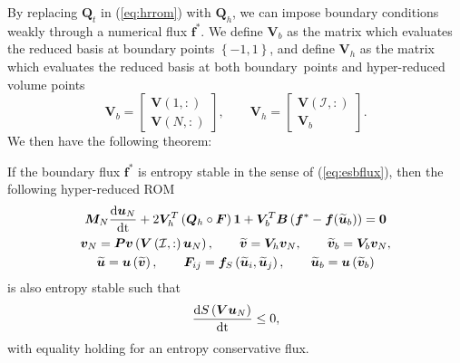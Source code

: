 \documentclass[review]{siamart171218}
\theoremstyle{assumption}
\renewcommand{\tilde}{\widetilde}
\newcommand{\td}[2]{\frac{{\rm d}#1}{{\rm d}{\rm #2}}}
\newcommand{\LRp}[1]{\left( #1 \right)}
\newcommand{\LRc}[1]{\left\{ #1 \right\}}
\begin{document}
By replacing $\bm{Q}_t$ in (\ref{eq:hrrom}) with $\bm{Q}_h$, we can impose boundary conditions weakly through a numerical flux $\bm{f}^*$.  We define $\bm{V}_b$ as the matrix which evaluates the reduced basis at boundary points $\LRc{-1,1}$, and define $\bm{V}_h$ as the matrix which evaluates the reduced basis at both boundary points and hyper-reduced volume points
\[
\bm{V}_{b} = \begin{bmatrix}\bm{V}(1,:) \\ \bm{V}(N,:)\end{bmatrix}, \qquad \bm{V}_h = \begin{bmatrix}
\bm{V}\LRp{\mathcal{I},:}\\
\bm{V}_{b}
\end{bmatrix}.
\]
We then have the following theorem:
\begin{theorem}
If the boundary flux $\bm{f}^*$ is entropy stable in the sense of (\ref{eq:esbflux}), then the following hyper-reduced ROM 
\begin{gather}
\bm{M}_N\td{\bm{u}_N}{t} + 2\bm{V}_h^T\LRp{\bm{Q}_h \circ \bm{F}}\bm{1} + \bm{V}_{b}^T\bm{B}\LRp{\bm{f}^* - \bm{f}(\tilde{\bm{u}}_b)} = \bm{0} \label{eq:esbchr}\\
\bm{v}_N = \bm{P}\bm{v}\LRp{\bm{V}\LRp{\mathcal{I},:}\bm{u}_N}, \qquad \tilde{\bm{v}} = 
\bm{V}_h
\bm{v}_N, \qquad \tilde{\bm{v}}_b = \bm{V}_b\bm{v}_N, \nonumber\\
\tilde{\bm{u}} = \bm{u}\LRp{\tilde{\bm{v}}}, \qquad \bm{F}_{ij} = \bm{f}_S\LRp{\tilde{\bm{u}}_i,\tilde{\bm{u}}_j}, \qquad  \tilde{\bm{u}}_b = \bm{u}\LRp{\tilde{\bm{v}}_b}\nonumber
\end{gather}
is also entropy stable such that
\[
\td{S\LRp{\bm{V}\bm{u}_N}}{t} \leq 0,
\]
with equality holding for an entropy conservative flux.
\label{thm:esbchr}
\end{theorem}
\end{document}
